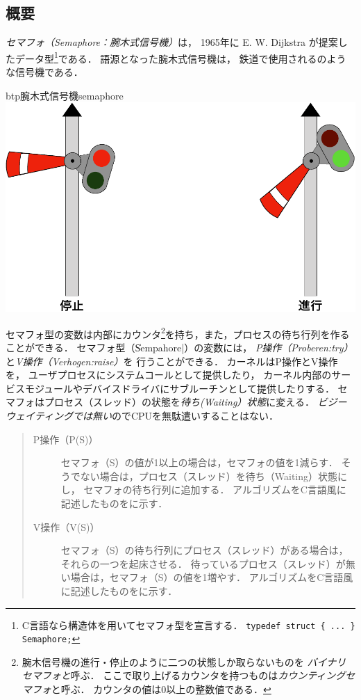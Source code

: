 \subsection{概要}
\emph{セマフォ（Semaphore：腕木式信号機）}は，
1965年に E. W. Dijkstra が提案したデータ型\footnote{
  C言語なら構造体を用いてセマフォ型を宣言する．
  \texttt{typedef struct \{ ... \} Semaphore;}
}である．
語源となった腕木式信号機は，
鉄道で使用されるのような信号機である．

\begin{myfig}{btp}{腕木式信号機}{semaphore}
  \includegraphics[scale=0.4]{Fig/semaphore-crop.pdf}
\end{myfig}

セマフォ型の変数は内部にカウンタ\footnote{
  腕木信号機の進行・停止のように二つの状態しか取らないものを
  \emph{バイナリセマフォと}呼ぶ．
  ここで取り上げるカウンタを持つものは\emph{カウンティングセマフォ}と呼ぶ．
  カウンタの値は0以上の整数値である．
}を持ち，また，プロセスの待ち行列を作ることができる．
セマフォ型（\|Sempahore|）の変数には，
\emph{P操作（Proberen:try）}と\emph{V操作（Verhogen:raise）}を
行うことができる．
カーネルはP操作とV操作を，
ユーザプロセスにシステムコールとして提供したり，
カーネル内部のサービスモジュールやデバイスドライバにサブルーチンとして提供したりする．
セマフォはプロセス（スレッド）の状態を\emph{待ち(Waiting）状態}に変える．
  \emph{ビジーウェイティングでは無い}のでCPUを無駄遣いすることはない．

\begin{quote}
  \begin{description}
  \item[P操作（P(S)）]
    セマフォ（S）の値が1以上の場合は，セマフォの値を1減らす．
    そうでない場合は，プロセス（スレッド）を待ち（Waiting）状態にし，
    セマフォの待ち行列に追加する．
    アルゴリズムをC言語風に記述したものをに示す．
  \item[V操作（V(S)）]
    セマフォ（S）の待ち行列にプロセス（スレッド）がある場合は，
    それらの一つを起床させる．
    待っているプロセス（スレッド）が無い場合は，セマフォ（S）の値を1増やす．
    アルゴリズムをC言語風に記述したものをに示す．
  \end{description}
\end{quote}

